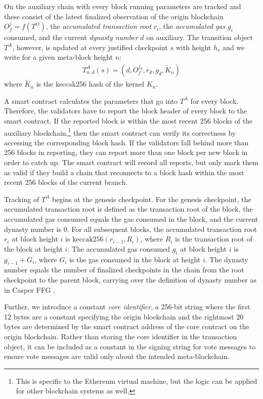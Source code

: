 \documentclass[12pt,a4paper]{article}
\begin{document}
On the auxiliary chain with every block running parameters are tracked and these consist of the latest finalized observation of the origin blockchain $O^j_f= f(T^O)$, the \emph{accumulated transaction root} $r_i$, the \emph{accumulated gas} $g_i$ consumed, and the current \emph{dynasty number} $d$ on auxiliary.
The transition object $T^A$, however, is updated at every justified checkpoint $s$ with height $h_s$ and we write for a given meta-block height $n$:
\begin{align*}
  T^A_{n,d}(s) = (d, O^{j_d}_f, r_d, g_d, \tilde{K}_n)
\end{align*}
where $\tilde{K}_n$ is the keccak256 hash of the kernel $K_n$.

A smart contract calculates the parameters that go into $T^A$ for every block.
Therefore, the validators have to report the block header of every block to the smart contract.
If the reported block is within the most recent 256 blocks of the auxiliary blockchain,\footnote{
	This is specific to the Ethereum virtual machine, but the logic can be applied for other blockchain systems as well.
}
then the smart contract can verify its correctness by accessing the corresponding block hash.
If the validators fall behind more than 256 blocks in reporting, they can report more than one block per new block in order to catch up.
The smart contract will record all reports, but only mark them as valid if they build a chain that reconnects to a block hash within the most recent 256 blocks of the current branch.

Tracking of $T^A$ begins at the genesis checkpoint.
For the genesis checkpoint, the accumulated transaction root is defined as the transaction root of the block, the accumulated gas consumed equals the gas consumed in the block, and the current dynasty number is 0.
For all subsequent blocks, the accumulated transaction root $r_i$ at block height $i$ is $\text{keccak256}(r_{i-1}, R_i)$, where $R_i$ is the transaction root of the block at height $i$.
The accumulated gas consumed $g_i$ at block height $i$ is $g_{i-1} + G_i$, where $G_i$ is the gas consumed in the block at height $i$.
The dynasty number equals the number of finalized checkpoints in the chain from the root checkpoint to the parent block, carrying over the definition of dynasty number as in Casper FFG \cite{casperffg}.

Further, we introduce a constant \emph{core identifier}, a 256-bit string where the first 12 bytes are a constant specifying the origin blockchain and the rightmost 20 bytes are determined by the smart contract address of the core contract on the origin blockchain.
Rather than storing the core identifier in the transaction object, it can be included as a constant in the signing string for vote messages to ensure vote messages are valid only about the intended meta-blockchain.
\end{document}
